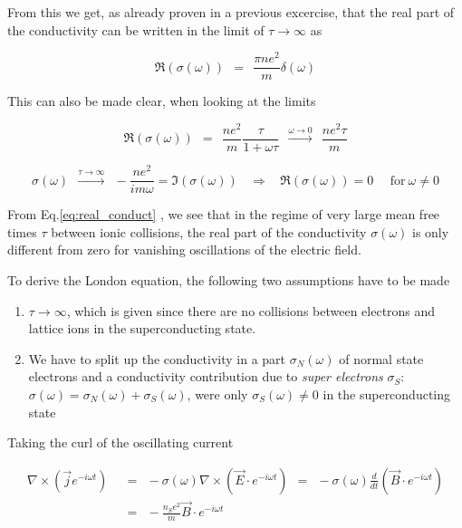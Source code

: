 \documentclass[10pt]{report}
\numberwithin{equation}{chapter}
\newcommand{\myEq}[1]{
  Eq.\ref{#1}
}
\begin{document}
From this we get, as already proven in a previous excercise, that the real part of the conductivity can be written in the limit of $\tau \rightarrow \infty$ as

\begin{equation}\label{eq:real_conduct}
  \Re(\sigma(\omega)) ~~=~~ \frac{\pi n e^2}{m} \delta(\omega)
\end{equation}


This can also be made clear, when looking at the limits

\begin{equation}
  \Re(\sigma(\omega)) ~~=~~ \frac{ne^2}{m} \frac{\tau}{1+\omega \tau}~~ \xrightarrow{\omega \rightarrow 0} ~~
  \frac{ne^2 \tau}{m}
\end{equation}

\begin{equation}
  \sigma(\omega) ~~ \xrightarrow{\tau \rightarrow \infty} ~~ -\frac{ne^2}{im\omega} = \Im(\sigma(\omega)) ~~~~ \Rightarrow ~~~~ \Re(\sigma(\omega)) = 0 ~~~~~~\text{for}\ \omega \neq 0
\end{equation}


From \myEq{eq:real_conduct}, we see that in the regime of very large mean free times $\tau$ between ionic collisions, the real part of the conductivity $\sigma(\omega)$ is only different from zero for vanishing oscillations of the electric field. 

To derive the London equation, the following two assumptions have to be made

\begin{enumerate}
\item{$\tau \rightarrow \infty$, which is given since there are no collisions between electrons and lattice ions in the superconducting state.}
\item{We have to split up the conductivity in a part $\sigma_{N}(\omega)$ of normal state electrons and a conductivity contribution due to \textit{super electrons} $\sigma_{S}$: 
$\sigma(\omega) = \sigma_N(\omega) + \sigma_S(\omega)$, were only $\sigma_S(\omega) \neq 0$ in the superconducting state}
\end{enumerate}


Taking the curl of the oscillating current

\begin{align}\label{eq:curl_curr}
  \nabla \times (\vec{j} e^{-i\omega t}) & ~~=~~ -\sigma(\omega) \nabla \times (\vec{E}\cdot e^{-i\omega t}) ~~=~~
  -\sigma(\omega) \frac{d}{dt} (\vec{B} \cdot e^{-i\omega t})\nonumber \\
    & ~~=~~ - \frac{n_Se^2}{m} \vec{B} \cdot e^{-i\omega t}
\end{align}
\end{document}
